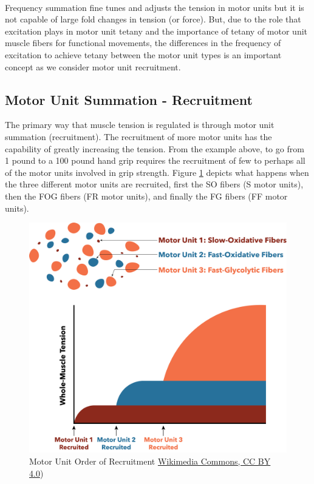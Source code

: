 \paragraph{}

Frequency summation fine tunes and adjusts the tension in motor units but it is not capable of large fold changes in tension (or force). But, due to the role that excitation plays in motor unit tetany and the importance of tetany of motor unit muscle fibers for functional movements, the differences in the frequency of excitation to achieve tetany between the motor unit types is an important concept as we consider motor unit recruitment.

\subsection{Motor Unit Summation - Recruitment}

The primary way that muscle tension is regulated is through motor unit summation (recruitment). The recruitment of more motor units has the capability of greatly increasing the tension. From the example above, to go from 1 pound to a 100 pound hand grip requires the recruitment of few to perhaps all of the motor units involved in grip strength. Figure \ref{fig:Motor_unit_recruitment} depicts what happens when the three different motor units are recruited, first the SO fibers (S motor units), then the FOG fibers (FR motor units), and finally the FG fibers (FF motor units).\footnotemark{}


\begin{figure}[!ht]
    \centering
    \includegraphics[width=1\linewidth]{./figure/Motor_unit_recruitment.png}
    \caption{Motor Unit Order of Recruitment \footnotesize{\href{https://commons.wikimedia.org/wiki/File:Motor_unit_recruitment.png}{Wikimedia Commons, CC BY 4.0})}}
    \label{fig:Motor_unit_recruitment}
\end{figure}

